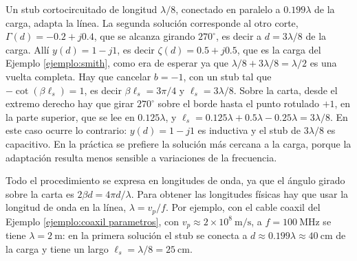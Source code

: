 \begin{ejemplo}
Un stub cortocircuitado de longitud $\lambda/8$, conectado en paralelo a $0.199\lambda$ de la carga, adapta la línea. La segunda solución corresponde al otro corte, $\Gamma(d)=-0.2+j0.4$, que se alcanza girando $270^\circ$, es decir a $d=3\lambda/8$ de la carga. Allí $y(d)=1-j1$, es decir $\zeta(d)=0.5+j0.5$, que es la carga del Ejemplo \ref{ejemplo:smith}, como era de esperar ya que $\lambda/8+3\lambda/8=\lambda/2$ es una vuelta completa. Hay que cancelar $b=-1$, con un stub tal que $-\cot(\beta\ell_s)=1$, es decir $\beta\ell_s=3\pi/4$ y $\ell_s=3\lambda/8$. Sobre la carta, desde el extremo derecho hay que girar $270^\circ$ sobre el borde hasta el punto rotulado $+1$, en la parte superior, que se lee en $0.125\lambda$, y $\ell_s=0.125\lambda+0.5\lambda-0.25\lambda=3\lambda/8$. En este caso ocurre lo contrario: $y(d)=1-j1$ es inductiva y el stub de $3\lambda/8$ es capacitivo. En la práctica se prefiere la solución más cercana a la carga, porque la adaptación resulta menos sensible a variaciones de la frecuencia.

Todo el procedimiento se expresa en longitudes de onda, ya que el ángulo girado sobre la carta es $2\beta d=4\pi d/\lambda$. Para obtener las longitudes físicas hay que usar la longitud de onda en la línea, $\lambda=v_p/f$. Por ejemplo, con el cable coaxil del Ejemplo \ref{ejemplo:coaxil parametros}, con $v_p\approx 2\times 10^8\ \unit{\meter\per\second}$, a $f=100\ \unit{\mega\hertz}$ se tiene $\lambda=2\ \unit{\meter}$: en la primera solución el stub se conecta a $d\approx 0.199\lambda\approx 40\ \unit{\centi\meter}$ de la carga y tiene un largo $\ell_s=\lambda/8=25\ \unit{\centi\meter}$.
\end{ejemplo}

